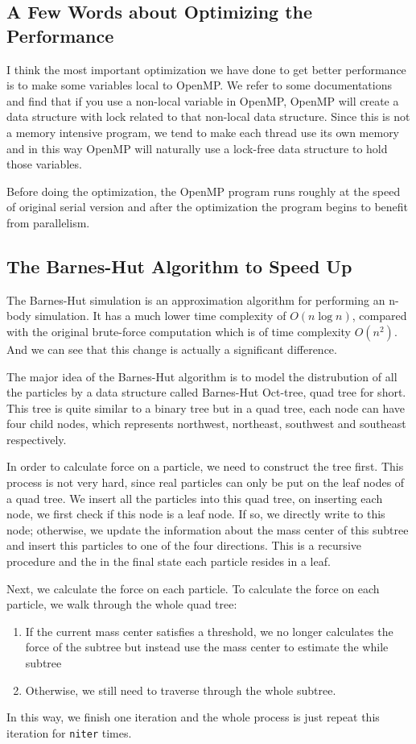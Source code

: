 \documentclass{article}
\begin{document}
\subsection{A Few Words about Optimizing the Performance}
I think the most important optimization we have done to get better performance is to make some variables local to OpenMP.
We refer to some documentations and find that if you use a non-local variable in OpenMP, OpenMP will create a data structure
with lock related to that non-local data structure. Since this is not a memory intensive program, we tend to make each thread use
its own memory and in this way OpenMP will naturally use a lock-free data structure to hold those variables.

Before doing the optimization, the OpenMP program runs roughly at the speed of original serial version and after the optimization
the program begins to benefit from parallelism.



\subsection{The Barnes-Hut Algorithm to Speed Up}
The Barnes-Hut simulation is an approximation algorithm for performing an
n-body simulation. It has a much lower time complexity of $O(n\log n)$,
compared with the original brute-force computation which is of time
complexity $O(n^2)$. And we can see that this change is actually a significant
difference.

The major idea of the Barnes-Hut algorithm is to model the distrubution of
all the particles by a data structure called Barnes-Hut Oct-tree, quad tree for short. This tree
is quite similar to a binary tree but in a quad tree, each node can have four child nodes,
which represents northwest, northeast, southwest and southeast respectively.

In order to calculate force on a particle, we need to construct the tree first. This process
is not very hard, since real particles can only be put on the leaf nodes of a quad tree.
We insert all the particles into this quad tree, on inserting each node, we first check if
this node is a leaf node. If so, we directly write to this node; otherwise, we update the
information about the mass center of this subtree and insert this particles to one of the four directions.
This is a recursive procedure and the in the final state each particle resides in a leaf.

Next, we calculate the force on each particle. To calculate the force on each particle, we walk
through the whole quad tree:
\begin{enumerate}
\item If the current mass center satisfies a threshold, we no longer calculates the force of
	the subtree but instead use the mass center to estimate the while subtree
\item Otherwise, we still need to traverse through the whole subtree.
\end{enumerate}
In this way, we finish one iteration and the whole process is just repeat this iteration for \verb|niter| times.
\end{document}
